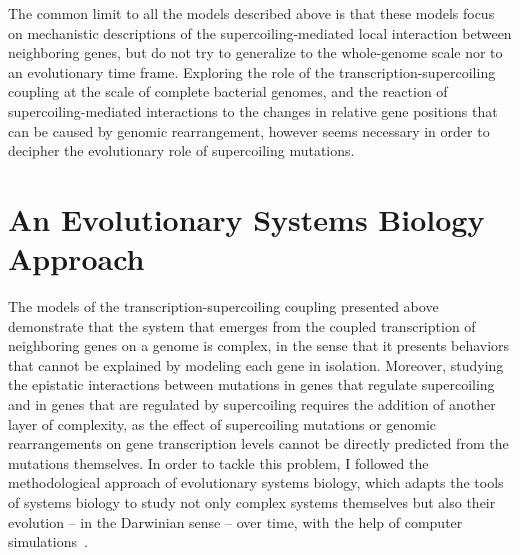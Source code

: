 The common limit to all the models described above is that these models focus on mechanistic descriptions of the supercoiling-mediated local interaction between neighboring genes, but do not try to generalize to the whole-genome scale nor to an evolutionary time frame.
Exploring the role of the transcription-supercoiling coupling at the scale of complete bacterial genomes, and the reaction of supercoiling-mediated interactions to the changes in relative gene positions that can be caused by genomic rearrangement, however seems necessary in order to decipher the evolutionary role of supercoiling mutations.


\section{An Evolutionary Systems Biology Approach}

The models of the transcription-supercoiling coupling presented above demonstrate that the system that emerges from the coupled transcription of neighboring genes on a genome is complex, in the sense that it presents behaviors that cannot be explained by modeling each gene in isolation.
Moreover, studying the epistatic interactions between mutations in genes that regulate supercoiling and in genes that are regulated by supercoiling requires the addition of another layer of complexity, as the effect of supercoiling mutations or genomic rearrangements on gene transcription levels cannot be directly predicted from the mutations themselves.
In order to tackle this problem, I followed the methodological approach of evolutionary systems biology, which adapts the tools of systems biology to study not only complex systems themselves but also their evolution -- in the Darwinian sense -- over time, with the help of computer simulations~\citep{beslon2021}.

